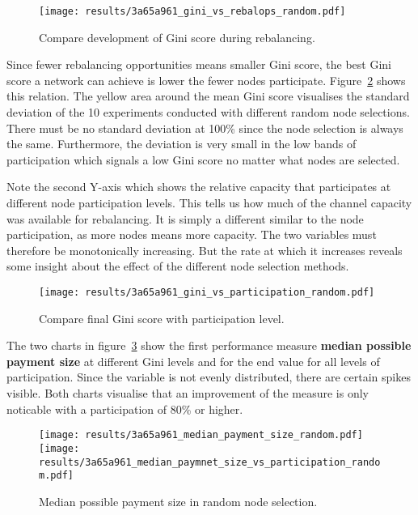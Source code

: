\documentclass[final]{fhnwreport}       %
\begin{document}
\begin{figure}[H]
\centering
\texttt{[image: results/3a65a961\_gini\_vs\_rebalops\_random.pdf]}
\caption{Compare development of Gini score during rebalancing.}
\label{fig:gini_rebal_rand}
\end{figure}

Since fewer rebalancing opportunities means smaller Gini score, the best Gini score a network can achieve is lower the fewer nodes participate. Figure~\ref{fig:gini_part_rand} shows this relation. The yellow area around the mean Gini score visualises the standard deviation of the 10 experiments conducted with different random node selections. There must be no standard deviation at 100\% since the node selection is always the same. Furthermore, the deviation is very small in the low bands of participation which signals a low Gini score no matter what nodes are selected. 

Note the second Y-axis which shows the relative capacity that participates at different node participation levels. This tells us how much of the channel capacity was available for rebalancing. It is simply a different similar to the node participation, as more nodes means more capacity. The two variables must therefore be monotonically increasing. But the rate at which it increases reveals some insight about the effect of the different node selection methods. 

\begin{figure}[H]
\centering
\texttt{[image: results/3a65a961\_gini\_vs\_participation\_random.pdf]}
\caption{Compare final Gini score with participation level.}
\label{fig:gini_part_rand}
\end{figure}

The two charts in figure~\ref{fig:pay_size_random} show the first performance measure \textbf{median possible payment size} at different Gini levels and for the end value for all levels of participation. Since the variable is not evenly distributed, there are certain spikes visible. Both charts visualise that an improvement of the measure is only noticable with a participation of 80\% or higher. 
\begin{figure}[htp]
\centering
\texttt{[image: results/3a65a961\_median\_payment\_size\_random.pdf]}\hfill
\texttt{[image: results/3a65a961\_median\_paymnet\_size\_vs\_participation\_random.pdf]}
\caption{Median possible payment size in random node selection.}
\label{fig:pay_size_random}
\end{figure}
\end{document}
